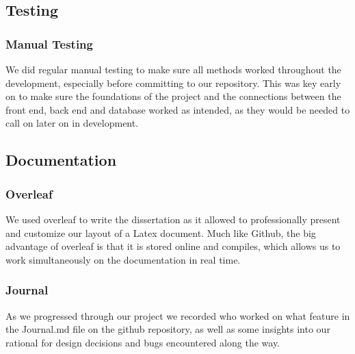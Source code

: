  \subsection{Testing}
 \subsubsection{Manual Testing}
 We did regular manual testing to make sure all methods worked throughout the development, especially before committing to our repository. This was key early on to make sure the foundations of the project and the connections between the front end, back end and database worked as intended, as they would be needed to call on later on in development.
 
 \subsection{Documentation}
 \subsubsection{Overleaf}
 We used overleaf to write the dissertation as it allowed to professionally present and customize our layout of a Latex document. Much like Github, the big advantage of overleaf is that it is stored online and compiles, which allows us to work simultaneously on the documentation in real time.
 
 \subsubsection{Journal}
 As we progressed through our project we recorded who worked on what feature in the Journal.md file on the github repository, as well as some insights into our rational for design decisions and bugs encountered along the way.